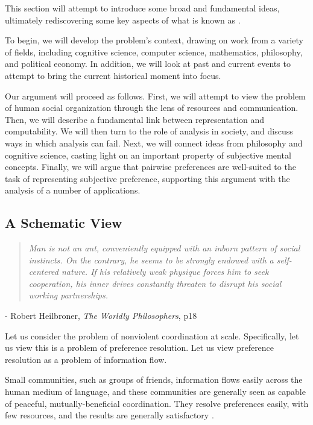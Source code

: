
This section will attempt to introduce some broad and fundamental ideas, ultimately rediscovering some key aspects of what is known as .

To begin, we will develop the problem's context, drawing on work from a variety of fields, including cognitive science, computer science, mathematics, philosophy, and political economy.
In addition, we will look at past and current events to attempt to bring the current historical moment into focus.

\bigskip

Our argument will proceed as follows.
First, we will attempt to view the problem of human social organization through the lens of resources and communication.
Then, we will describe a fundamental link between representation and computability.
We will then turn to the role of analysis in society, and discuss ways in which analysis can fail.
Next, we will connect ideas from philosophy and cognitive science, casting light on an important property of subjective mental concepts.
Finally, we will argue that pairwise preferences are well-suited to the task of representing subjective preference, supporting this argument with the analysis of a number of applications.

\subsection{A Schematic View}

\begin{center}
\begin{quotation}
\textit{Man is not an ant, conveniently equipped with an inborn pattern of social instincts.
	On the contrary, he seems to be strongly endowed with a self-centered nature.
	If his relatively weak physique forces him to seek cooperation, his inner drives constantly threaten to disrupt his social working partnerships.}
\end{quotation}
	- Robert Heilbroner, \textit{The Worldly Philosophers}, p18
\end{center}

Let us consider the problem of nonviolent coordination at scale.
Specifically, let us view this is a problem of preference resolution.
Let us view preference resolution as a problem of information flow.

Small communities, such as groups of friends, information flows easily across the human medium of language, and these communities are generally seen as capable of peaceful, mutually-beneficial coordination.
They resolve preferences easily, with few resources, and the results are generally satisfactory \cite{deacon}.

